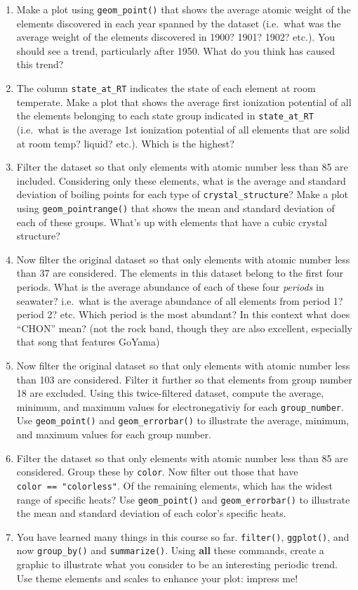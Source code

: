\documentclass[
]{krantz}
\begin{document}
\begin{enumerate}
\def\labelenumi{\arabic{enumi}.}
\item
  Make a plot using \texttt{geom\_point()} that shows the average atomic weight of the elements discovered in each year spanned by the dataset (i.e.~what was the average weight of the elements discovered in 1900? 1901? 1902? etc.). You should see a trend, particularly after 1950. What do you think has caused this trend?
\item
  The column \texttt{state\_at\_RT} indicates the state of each element at room temperate. Make a plot that shows the average first ionization potential of all the elements belonging to each state group indicated in \texttt{state\_at\_RT} (i.e.~what is the average 1st ionization potential of all elements that are solid at room temp? liquid? etc.). Which is the highest?
\item
  Filter the dataset so that only elements with atomic number less than 85 are included. Considering only these elements, what is the average and standard deviation of boiling points for each type of \texttt{crystal\_structure}? Make a plot using \texttt{geom\_pointrange()} that shows the mean and standard deviation of each of these groups. What's up with elements that have a cubic crystal structure?
\item
  Now filter the original dataset so that only elements with atomic number less than 37 are considered. The elements in this dataset belong to the first four periods. What is the average abundance of each of these four \emph{periods} in seawater? i.e.~what is the average abundance of all elements from period 1? period 2? etc. Which period is the most abundant? In this context what does ``CHON'' mean? (not the rock band, though they are also excellent, especially that song that features GoYama)
\item
  Now filter the original dataset so that only elements with atomic number less than 103 are considered. Filter it further so that elements from group number 18 are excluded. Using this twice-filtered dataset, compute the average, minimum, and maximum values for electronegativiy for each \texttt{group\_number}. Use \texttt{geom\_point()} and \texttt{geom\_errorbar()} to illustrate the average, minimum, and maximum values for each group number.
\item
  Filter the dataset so that only elements with atomic number less than 85 are considered. Group these by \texttt{color}. Now filter out those that have \texttt{color\ ==\ "colorless"}. Of the remaining elements, which has the widest range of specific heats? Use \texttt{geom\_point()} and \texttt{geom\_errorbar()} to illustrate the mean and standard deviation of each color's specific heats.
\item
  You have learned many things in this course so far. \texttt{filter()}, \texttt{ggplot()}, and now \texttt{group\_by()} and \texttt{summarize()}. Using \textbf{all} these commands, create a graphic to illustrate what you consider to be an interesting periodic trend. Use theme elements and scales to enhance your plot: impress me!
\end{enumerate}
\end{document}
